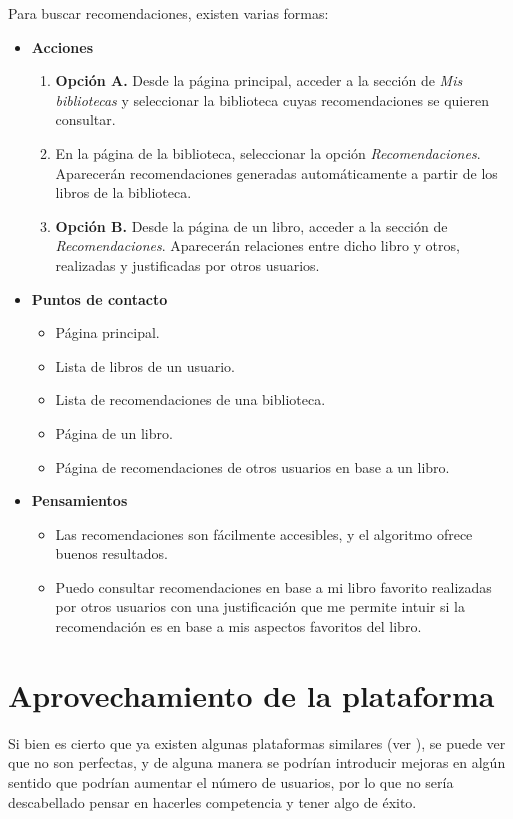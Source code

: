 Para buscar recomendaciones, existen varias formas:
\begin{itemize}
    \item \textbf{Acciones}
    \begin{enumerate}
        \item \textbf{Opción A.} Desde la página principal, acceder a la sección de \textit{Mis bibliotecas} y seleccionar la biblioteca cuyas recomendaciones se quieren consultar.
        \item En la página de la biblioteca, seleccionar la opción \textit{Recomendaciones}. Aparecerán recomendaciones generadas automáticamente a partir de los libros de la biblioteca.
        \item \textbf{Opción B.} Desde la página de un libro, acceder a la sección de \textit{Recomendaciones}. Aparecerán relaciones entre dicho libro y otros, realizadas y justificadas por otros usuarios.
    \end{enumerate}
\item \textbf{Puntos de contacto}
    \begin{itemize}
        \item Página principal.
        \item Lista de libros de un usuario.
        \item Lista de recomendaciones de una biblioteca.
        \item Página de un libro.
        \item Página de recomendaciones de otros usuarios en base a un libro.
    \end{itemize}
\item \textbf{Pensamientos}
    \begin{itemize}
        \item Las recomendaciones son fácilmente accesibles, y el algoritmo ofrece buenos resultados.
        \item Puedo consultar recomendaciones en base a mi libro favorito realizadas por otros usuarios con una justificación que me permite intuir si la recomendación es en base a mis aspectos favoritos del libro.
    \end{itemize}
\end{itemize}

\section{Aprovechamiento de la plataforma}
Si bien es cierto que ya existen algunas plataformas similares (ver ), se puede ver que no son perfectas, y de alguna manera se podrían introducir mejoras en algún sentido que podrían aumentar el número de usuarios, por lo que no sería descabellado pensar en hacerles competencia y tener algo de éxito.

